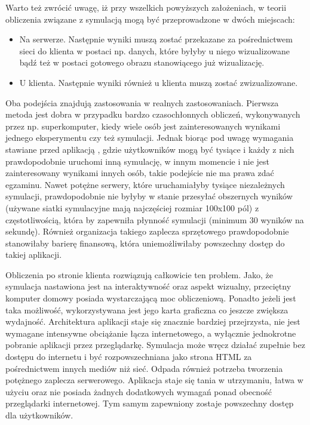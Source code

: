 Warto też zwrócić uwagę, iż przy wszelkich powyższych założeniach, w teorii
obliczenia związane z symulacją mogą być przeprowadzone w dwóch miejscach:

\begin{itemize} 

\item Na serwerze. Następnie wyniki muszą zostać przekazane za pośrednictwem
sieci do klienta w postaci np. danych, które byłyby u niego wizualizowane bądź
też w postaci gotowego obrazu stanowiącego już wizualizację.

\item U klienta. Następnie wyniki również u klienta muszą zostać zwizualizowane.

\end{itemize}

Oba podejścia znajdują zastosowania w realnych zastosowaniach. Pierwsza metoda
jest dobra w przypadku bardzo czasochłonnych obliczeń, wykonywanych przez np.
superkomputer, kiedy wiele osób jest zainteresowanych wynikami jednego
eksperymentu czy też symulacji. Jednak biorąc pod uwagę wymagania stawiane przed
aplikacją \en, gdzie użytkowników mogą być tysiące i każdy z nich prawdopodobnie
uruchomi inną symulację, w innym momencie i nie jest zainteresowany wynikami
innych osób, takie podejście nie ma prawa zdać egzaminu. Nawet potężne serwery,
które uruchamiałyby tysiące niezależnych symulacji, prawdopodobnie nie byłyby w
stanie przesyłać obszernych wyników (używane siatki symulacyjne mają najczęściej
rozmiar 100x100 pól) z częstotliwością, która by zapewniła płynność symulacji
(minimum 30 wyników na sekundę). Również organizacja takiego zaplecza
sprzętowego prawdopodobnie stanowiłaby barierę finansową, która uniemożliwiłaby
powszechny dostęp do takiej aplikacji.

Obliczenia po stronie klienta rozwiązują całkowicie ten problem. Jako, że
symulacja nastawiona jest na interaktywność oraz aspekt wizualny, przeciętny
komputer domowy posiada wystarczającą moc obliczeniową. Ponadto jeżeli jest
taka możliwość, wykorzystywana jest jego karta graficzna co jeszcze zwiększa
wydajność. Architektura aplikacji staje się znacznie bardziej przejrzysta, nie
jest wymagane intensywne obciążanie łącza internetowego, a wyłącznie jednokrotne
pobranie aplikacji przez przeglądarkę. Symulacja może wręcz działać zupełnie bez
dostępu do internetu i być rozpowszechniana jako strona HTML za pośrednictwem
innych mediów niż sieć. Odpada również potrzeba tworzenia potężnego zaplecza
serwerowego. Aplikacja staje się tania w utrzymaniu, łatwa w użyciu oraz nie
posiada żadnych dodatkowych wymagań ponad obecność przeglądarki internetowej.
Tym samym zapewniony zostaje powszechny dostęp dla użytkowników.

